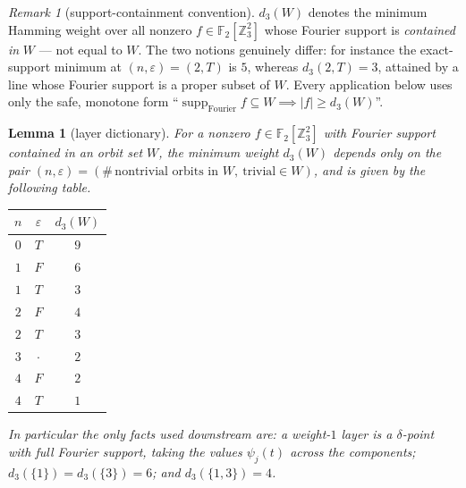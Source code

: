\documentclass[11pt]{article}
\newcommand{\Z}{\mathbb{Z}}
\newcommand{\F}[1]{\mathbb{F}_{#1}}
\newcommand{\wt}[1]{\lvert #1\rvert}
\DeclareMathOperator{\supp}{supp}
\newcommand{\aug}{\varepsilon}
\theoremstyle{plain}
\newtheorem{lemma}{Lemma}[section]
\theoremstyle{definition}
\theoremstyle{remark}
\newtheorem*{remark}{Remark}
\begin{document}
\begin{remark}[support-containment convention]
$d_3(W)$ denotes the minimum Hamming weight over all nonzero $f\in\F2[\Z_3^2]$
whose Fourier support is \emph{contained in} $W$ --- not equal to $W$. The two
notions genuinely differ: for instance the exact-support minimum at
$(n,\aug)=(2,T)$ is $5$, whereas $d_3(2,T)=3$, attained by a line whose Fourier
support is a proper subset of $W$. Every application below uses only the safe,
monotone form ``$\supp_{\mathrm{Fourier}}f\subseteq W\implies\wt f\ge d_3(W)$''.
\end{remark}

\begin{lemma}[layer dictionary]\label{lem:d3}
For a nonzero $f\in\F2[\Z_3^2]$ with Fourier support contained in an orbit set
$W$, the minimum weight $d_3(W)$ depends only on the pair
$(n,\aug)=(\#\,\text{nontrivial orbits in }W,\ \text{trivial}\in W)$, and is given
by the following table.

\begin{center}
\begin{tabular}{ccc}
\toprule
$n$ & $\aug$ & $d_3(W)$ \\
\midrule
$0$ & $T$ & $9$ \\
$1$ & $F$ & $6$ \\
$1$ & $T$ & $3$ \\
$2$ & $F$ & $4$ \\
$2$ & $T$ & $3$ \\
$3$ & $\cdot$ & $2$ \\
$4$ & $F$ & $2$ \\
$4$ & $T$ & $1$ \\
\bottomrule
\end{tabular}
\end{center}

In particular the only facts used downstream are: a weight-$1$ layer is a
$\delta$-point with full Fourier support, taking the values $\psi_j(t)$ across
the components; $d_3(\{1\})=d_3(\{3\})=6$; and $d_3(\{1,3\})=4$.
\end{lemma}
\end{document}
